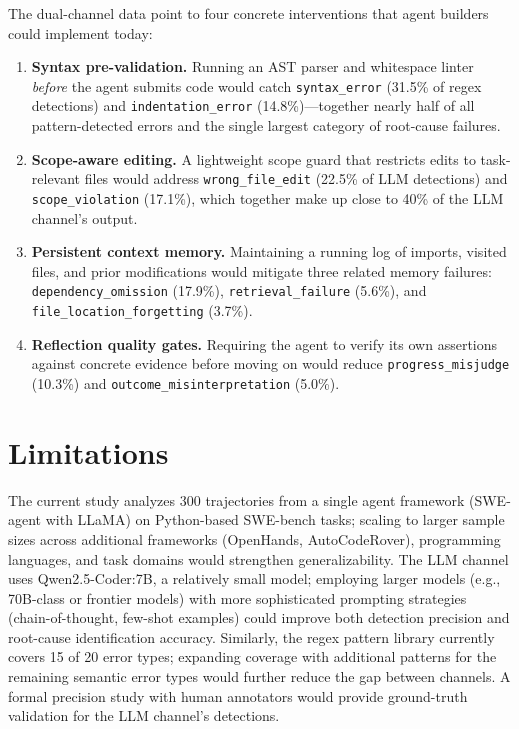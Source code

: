 \documentclass{ieeeaccess}
\begin{document}
The dual-channel data point to four concrete interventions that agent builders could implement today:

\begin{enumerate}
    \item \textbf{Syntax pre-validation.} Running an AST parser and whitespace linter \emph{before} the agent submits code would catch \texttt{syntax\_\allowbreak{}error} (31.5\% of regex detections) and \texttt{indentation\_\allowbreak{}error} (14.8\%)---together nearly half of all pattern-detected errors and the single largest category of root-cause failures.

    \item \textbf{Scope-aware editing.} A lightweight scope guard that restricts edits to task-relevant files would address \texttt{wrong\_\allowbreak{}file\_\allowbreak{}edit} (22.5\% of LLM detections) and \texttt{scope\_\allowbreak{}violation} (17.1\%), which together make up close to 40\% of the LLM channel's output.

    \item \textbf{Persistent context memory.} Maintaining a running log of imports, visited files, and prior modifications would mitigate three related memory failures: \texttt{dependency\_\allowbreak{}omission} (17.9\%), \texttt{retrieval\_\allowbreak{}failure} (5.6\%), and \texttt{file\_\allowbreak{}location\_\allowbreak{}forgetting} (3.7\%).

    \item \textbf{Reflection quality gates.} Requiring the agent to verify its own assertions against concrete evidence before moving on would reduce \texttt{progress\_\allowbreak{}misjudge} (10.3\%) and \texttt{outcome\_\allowbreak{}misinterpretation} (5.0\%).
\end{enumerate}


\section{Limitations}
\label{sec:discussion}

The current study analyzes 300 trajectories from a single agent framework (SWE-agent with LLaMA) on Python-based SWE-bench tasks; scaling to larger sample sizes across additional frameworks (OpenHands, AutoCodeRover), programming languages, and task domains would strengthen generalizability. The LLM channel uses Qwen2.5-Coder:7B, a relatively small model; employing larger models (e.g., 70B-class or frontier models) with more sophisticated prompting strategies (chain-of-thought, few-shot examples) could improve both detection precision and root-cause identification accuracy. Similarly, the regex pattern library currently covers 15 of 20 error types; expanding coverage with additional patterns for the remaining semantic error types would further reduce the gap between channels. A formal precision study with human annotators would provide ground-truth validation for the LLM channel's detections.
\end{document}
